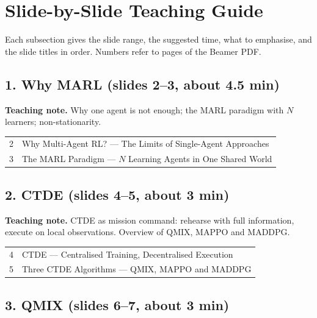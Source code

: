 \documentclass[11pt]{article}
\begin{document}
\section{Slide-by-Slide Teaching Guide}

Each subsection gives the slide range, the suggested time, what to emphasise, and the slide titles in order. Numbers refer to pages of the Beamer PDF.

\subsection{1. Why MARL \normalfont\small\color{GreyN}(slides 2--3, about 4.5 min)}

\textbf{Teaching note.} Why one agent is not enough; the MARL paradigm with $N$ learners; non-stationarity.

\begin{center}\small\renewcommand{\arraystretch}{1.1}\begin{tabularx}{\textwidth}{@{}r X@{}}2 & Why Multi-Agent RL? --- The Limits of Single-Agent Approaches\\
3 & The MARL Paradigm --- $N$ Learning Agents in One Shared World\\\end{tabularx}\end{center}

\subsection{2. CTDE \normalfont\small\color{GreyN}(slides 4--5, about 3 min)}

\textbf{Teaching note.} CTDE as mission command: rehearse with full information, execute on local observations. Overview of QMIX, MAPPO and MADDPG.

\begin{center}\small\renewcommand{\arraystretch}{1.1}\begin{tabularx}{\textwidth}{@{}r X@{}}4 & CTDE --- Centralised Training, Decentralised Execution\\
5 & Three CTDE Algorithms --- QMIX, MAPPO and MADDPG\\\end{tabularx}\end{center}

\subsection{3. QMIX \normalfont\small\color{GreyN}(slides 6--7, about 3 min)}
\end{document}
